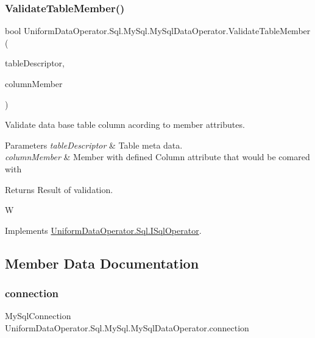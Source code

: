 \subsubsection{\texorpdfstring{Validate\+Table\+Member()}{ValidateTableMember()}}
{\footnotesize\ttfamily bool Uniform\+Data\+Operator.\+Sql.\+My\+Sql.\+My\+Sql\+Data\+Operator.\+Validate\+Table\+Member (\begin{DoxyParamCaption}\item[{\mbox{\hyperlink{class_uniform_data_operator_1_1_sql_1_1_attributes_1_1_table}{Table}}}]{table\+Descriptor,  }\item[{Member\+Info}]{column\+Member }\end{DoxyParamCaption})}



Validate data base table column acording to member attributes. 


\begin{DoxyParams}{Parameters}
{\em table\+Descriptor} & Table meta data.\\
\hline
{\em column\+Member} & Member with defined Column attribute that would be comared with \\
\hline
\end{DoxyParams}
\begin{DoxyReturn}{Returns}
Result of validation.
\end{DoxyReturn}
W 

Implements \mbox{\hyperlink{interface_uniform_data_operator_1_1_sql_1_1_i_sql_operator_a3b5fbe97e664e1ef689576ab8757f957}{Uniform\+Data\+Operator.\+Sql.\+I\+Sql\+Operator}}.



\subsection{Member Data Documentation}
\mbox{\label{class_uniform_data_operator_1_1_sql_1_1_my_sql_1_1_my_sql_data_operator_a807f034631cd8284ecc020d765e6f6f1}} 
\subsubsection{\texorpdfstring{connection}{connection}}
{\footnotesize\ttfamily My\+Sql\+Connection Uniform\+Data\+Operator.\+Sql.\+My\+Sql.\+My\+Sql\+Data\+Operator.\+connection\hspace{0.3cm}{\ttfamily [private]}}



